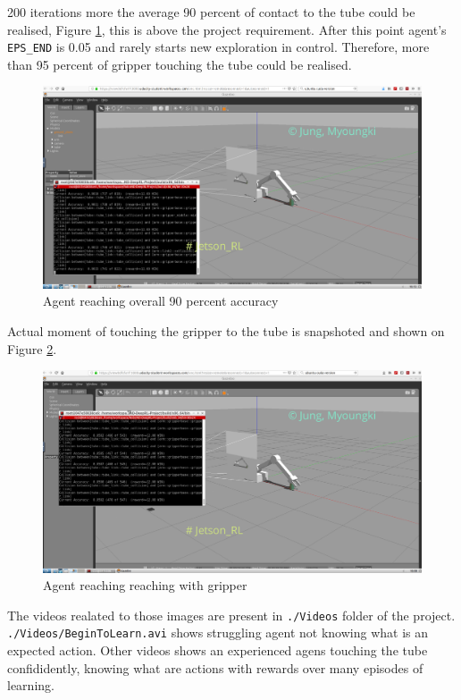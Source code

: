 \documentclass[10pt,journal,compsoc]{IEEEtran}
\begin{document}
200 iterations more the average 90 percent of contact to the tube could be realised, Figure \ref{fig:over90p}, this is above the project requirement. After this point agent's \verb!EPS_END! is 0.05 and rarely starts new exploration in control. Therefore, more than 95 percent of gripper touching the tube could be realised.
\begin{figure}[thpb]
      \centering
      \includegraphics[width=\linewidth]{./img/over90p.png}
      \caption{Agent reaching overall 90 percent accuracy}
      \label{fig:over90p}
\end{figure}

Actual moment of touching the gripper to the tube is snapshoted and shown on Figure \ref{fig:touchingGR86p}.
\begin{figure}[thpb]
      \centering
      \includegraphics[width=\linewidth]{./img/touchingGR86p.png}
      \caption{Agent reaching reaching with gripper}
      \label{fig:touchingGR86p}
\end{figure}
The videos realated to those images are present in \verb!./Videos! folder of the project.  \verb!./Videos/BeginToLearn.avi! shows struggling agent not knowing what is an expected action. Other videos shows an experienced agens touching the tube confididently, knowing what are actions with rewards over many episodes of learning.
\end{document}
